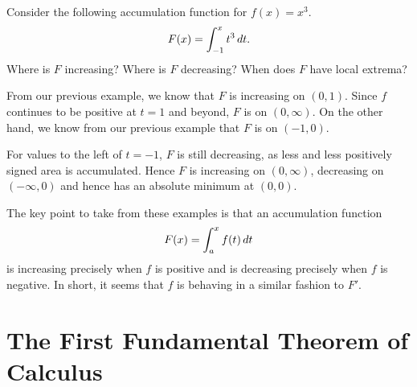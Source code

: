 \documentclass{ximera}
\begin{document}
\begin{example} 
Consider the following accumulation function for $f(x) = x^3$.
\[
F(x) = \int_{-1}^x t^3 \mathop{}\!d t.
\]
Where is $F$ increasing? Where is $F$ decreasing? When does
$F$ have local extrema?
\begin{explanation}
From our previous example, we know that $F$ is increasing on
$(0,1)$. Since $f$ continues to be positive at $t=1$ and beyond, $F$
is  on
$(0,\infty)$. On the other hand, we know from our previous example
that $F$ is
 on
$(-1,0)$.
\begin{image}
\end{image}
For values to the left of $t=-1$, $F$ is still decreasing, as less and
less positively signed area is accumulated. Hence $F$ is increasing on
$(0,\infty)$, decreasing on $(-\infty,0)$ and hence has an absolute
minimum at $(0,0)$.
\end{explanation}
\end{example}
The key point to take from these examples is that an accumulation
function
\[
F(x) = \int_a^x f(t) \mathop{}\!d t
\]
is increasing precisely when $f$ is positive and is decreasing
precisely when $f$ is negative. In short, it seems that $f$ is
behaving in a similar fashion to $F'$.



\section{The First Fundamental Theorem of Calculus}
\end{document}
